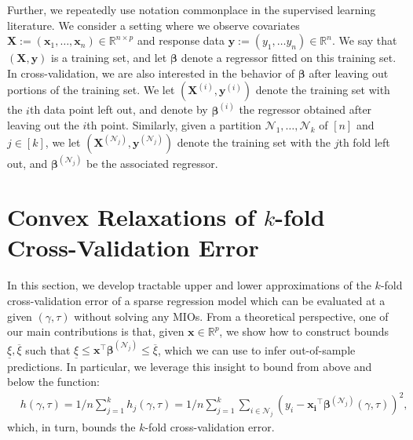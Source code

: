 \documentclass[ijoc,noblindrev]{informs3} %
\begin{document}
Further, we repeatedly use notation commonplace in the supervised learning literature. We consider a setting where we observe covariates $\bm{X}:=(\bm{x}_1, \ldots, \bm{x}_n) \in \mathbb{R}^{n \times p}$ and response data $\bm{y}:=(y_1, \ldots y_n) \in \mathbb{R}^n$. %
We say that $(\bm{X}, \bm{y})$ is a training set, and let $\bm{\beta}$ denote a regressor fitted on this training set. In cross-validation, we are also interested in the behavior of $\bm{\beta}$ after {\color{black}leaving out portions of} the training set. We let $(\bm{X}^{(i)}, \bm{y}^{(i)})$ denote the training set with the $i$th data point left out, and denote by $\bm{\beta}^{(i)}$ the regressor obtained after leaving out the $i$th point. {\color{black}Similarly, given a partition $\mathcal{N}_1,\dots,\mathcal{N}_k$  of $[n]$ and $j\in [k]$, we let $(\bm{X}^{(\mathcal{N}_j)}, \bm{y}^{(\mathcal{N}_j)})$ denote the training set with the $j$th fold left out, and $\bm{\beta}^{(\mathcal{N}_j)}$ be the associated regressor.} 



\section{Convex Relaxations of $k$-fold Cross-Validation Error}\label{sec:lowerbounds}

In this section, we develop tractable upper and lower approximations of the $k$-fold cross-validation error of a sparse regression model which can be evaluated at a given $(\gamma, \tau)$ without solving any MIOs. From a theoretical perspective, one of our main contributions is that, given $\bm{x}\in \mathbb{R}^p$, we show how to construct bounds $\underline \xi,\overline\xi$ such that $\underline \xi\leq \bm{x^\top\beta}^{(\mathcal{N}_j)}\leq \overline \xi$, which we can use to infer out-of-sample predictions. In particular, we leverage this insight to bound from above and below the function:
\begin{align}
	&h(\gamma, \tau)=1/n \sum_{j=1}^k h_j(\gamma, \tau)=1/n\sum_{j=1}^k\sum_{i \in \mathcal{N}_j}\left(y_i -\bm{x_i}^\top \bm{\beta}^{(\mathcal{N}_j)}(\gamma,\tau)\right)^2,\label{eqn:crossValError}
\end{align} 
which, in turn, bounds the $k$-fold cross-validation error.
\end{document}
